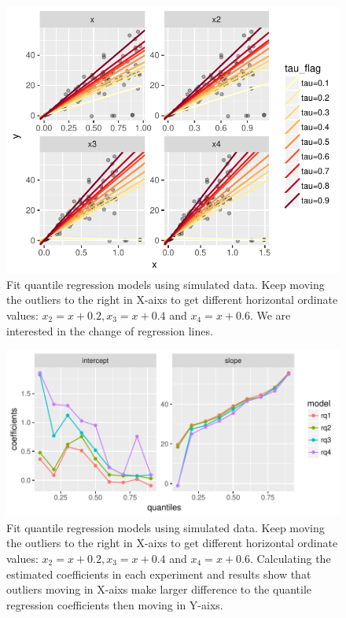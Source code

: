 \documentclass[article]{jss}
\theoremstyle{definition}
\theoremstyle{definition}
\theoremstyle{remark}
\begin{document}
\begin{CodeChunk}
\begin{figure}

{\centering \includegraphics{Diagnosing_outliers_and_visualization_of_quantile_regression_models_files/figure-latex/move-x1-1} 

}

\caption{Fit quantile regression models using simulated data. Keep moving the outliers to the right in X-aixs to get different horizontal ordinate values: $x_{2}=x+0.2, x_{3}=x+0.4$ and $x_{4}=x+0.6$. We are interested in the change of regression lines.}\label{fig:move-x1}
\end{figure}
\end{CodeChunk}

\begin{CodeChunk}
\begin{figure}

{\centering \includegraphics{Diagnosing_outliers_and_visualization_of_quantile_regression_models_files/figure-latex/move-x2-1} 

}

\caption{Fit quantile regression models using simulated data. Keep moving the outliers to the right in X-aixs to get different horizontal ordinate values: $x_{2}=x+0.2, x_{3}=x+0.4$ and $x_{4}=x+0.6$. Calculating the estimated coefficients in each experiment and results show that outliers moving in X-aixs make larger difference to the quantile regression coefficients then moving in Y-aixs.}\label{fig:move-x2}
\end{figure}
\end{CodeChunk}
\end{document}
